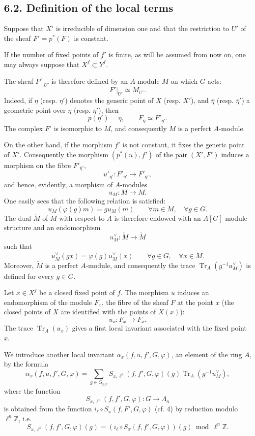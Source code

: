 \documentclass[11pt]{article}
\providecommand{\Tr}{\operatorname{Tr}}
\providecommand{\Tr}{\operatorname{Tr}}
\providecommand{\Tr}{\operatorname{Tr}}
\providecommand{\Tr}{\operatorname{Tr}}
\providecommand{\La}{\Lambda}
\providecommand{\bZ}{\mathbb Z}
\providecommand{\Tr}{\operatorname{Tr}}
\begin{document}
\subsection*{6.2. Definition of the local terms}
Suppose that $X'$ is irreducible of dimension one and that the restriction to $U'$ of the sheaf $F'=p^*(F)$ is constant.

If the number of fixed points of $f'$ is finite, as will be assumed from now on, one may always suppose that $X^f\subset Y^f$.

The sheaf $F'|_{U'}$ is therefore defined by an $A$-module $M$ on which $G$ acts:
\[
F'|_{U'}\simeq M_{U'}.
\]
Indeed, if $\eta$ (resp. $\eta'$) denotes the generic point of $X$ (resp. $X'$), and $\bar\eta$ (resp. $\bar\eta'$) a geometric point over $\eta$ (resp. $\eta'$), then
\[
p(\eta')=\eta,\qquad F_{\bar\eta}\simeq F'_{\bar\eta'}.
\]
The complex $F'$ is isomorphic to $M$, and consequently $M$ is a perfect $A$-module.

On the other hand, if the morphism $f'$ is not constant, it fixes the generic point of $X'$. Consequently the morphism $(p^*(u),f')$ of the pair $(X',F')$ induces a morphism on the fibre $F'_{\bar\eta'}$,
\[
u'_{\bar\eta'}:F'_{\bar\eta'}\longrightarrow F'_{\bar\eta'},
\]
and hence, evidently, a morphism of $A$-modules
\[
u_M:M\longrightarrow M.
\]
One easily sees that the following relation is satisfied:
\begin{equation}\tag{6.2.1}
u_M(\varphi(g)m)=g u_M(m) \qquad \forall m\in M,\quad \forall g\in G.
\end{equation}
The dual $\check{M}$ of $M$ with respect to $A$ is therefore endowed with an $A[G]$-module structure and an endomorphism
\[
u_M^\vee:\check{M}\longrightarrow \check{M}
\]
such that
\[
u_M^\vee(gx)=\varphi(g)u_M^\vee(x) \qquad \forall g\in G,\quad \forall x\in \check{M}.
\]
Moreover, $\check{M}$ is a perfect $A$-module, and consequently the trace $\Tr_A(g^{-1}u_M^\vee)$ is defined for every $g\in G$.

Let $x\in X^f$ be a closed fixed point of $f$. The morphism $u$ induces an endomorphism of the module $F_x$, the fibre of the sheaf $F$ at the point $x$ (the closed points of $X$ are identified with the points of $X(x)$):
\[
u_x:F_x\longrightarrow F_x.
\]
The trace $\Tr_A(u_x)$ gives a first local invariant associated with the fixed point $x$.

We introduce another local invariant $\alpha_x(f,u,f',G,\varphi)$, an element of the ring $A$, by the formula
\begin{equation}\tag{6.2.2}
\alpha_x(f,u,f',G,\varphi)=
\sum_{g\in G_{\natural,\varphi}}
S_{x,\ell^n}(f,f',G,\varphi)(g)\Tr_A(g^{-1}u_M^\vee),
\end{equation}
where the function
\[
S_{x,\ell^n}(f,f',G,\varphi):G\longrightarrow\La_n
\]
is obtained from the function $i_\ell\circ S_x(f,F',G,\varphi)$ (cf. 4) by reduction modulo $\ell^n\bZ$, i.e.
\[
S_{x,\ell^n}(f,f',G,\varphi)(g)=
(i_\ell\circ S_x(f,f',G,\varphi))(g)\bmod \ell^n\bZ.
\]
\end{document}

